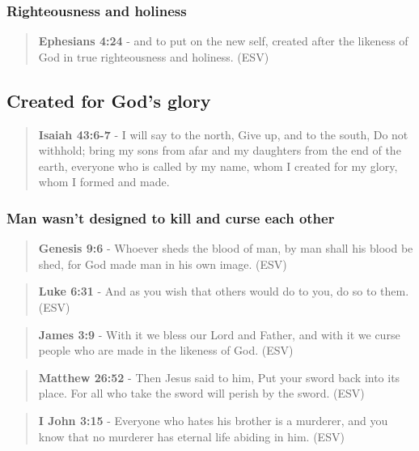 \documentclass[11pt]{article}
\begin{document}
\subsubsection{Righteousness and holiness}
\label{sec:orge5f82cc}
\begin{quote}
\textbf{Ephesians 4:24} - and to put on the new self, created after the likeness of God in true righteousness and holiness. (ESV)
\end{quote}

\subsection{Created for God's glory}
\label{sec:org86969e6}
\begin{quote}
\textbf{Isaiah 43:6-7} - I will say to the north, Give up, and to the south, Do not withhold; bring my sons from afar and my daughters from the end of the earth, everyone who is called by my name, whom I created for my glory, whom I formed and made.
\end{quote}

\subsubsection{Man wasn't designed to kill and curse each other}
\label{sec:orgd8b4991}
\begin{quote}
\textbf{Genesis 9:6} - Whoever sheds the blood of man, by man shall his blood be shed, for God made man in his own image. (ESV)
\end{quote}

\begin{quote}
\textbf{Luke 6:31} - And as you wish that others would do to you, do so to them. (ESV)
\end{quote}

\begin{quote}
\textbf{James 3:9} - With it we bless our Lord and Father, and with it we curse people who are made in the likeness of God. (ESV)
\end{quote}

\begin{quote}
\textbf{Matthew 26:52} - Then Jesus said to him, Put your sword back into its place.  For all who take the sword will perish by the sword. (ESV)
\end{quote}

\begin{quote}
\textbf{I John 3:15} - Everyone who hates his brother is a murderer, and you know that no murderer has eternal life abiding in him. (ESV)
\end{quote}
\end{document}
